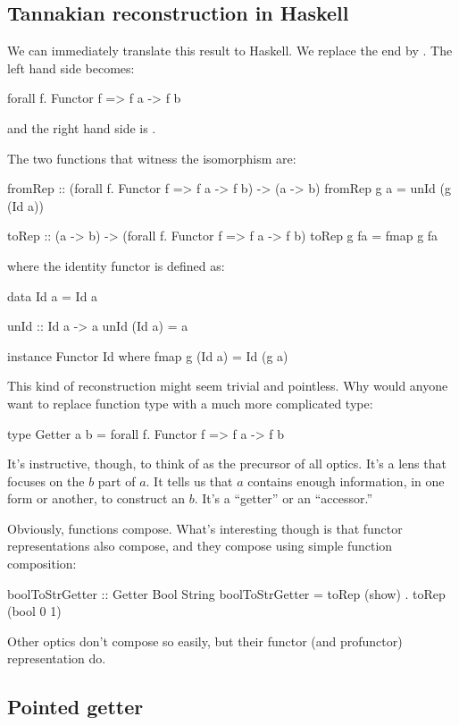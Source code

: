 \documentclass[DaoFP]{subfiles}
\begin{document}
\subsection{Tannakian reconstruction in Haskell}

We can immediately translate this result to Haskell. We replace the end by . The left hand side becomes:
\begin{haskell}
forall f. Functor f => f a -> f b
\end{haskell}
and the right hand side is .

The two functions that witness the isomorphism are:
\begin{haskell}
fromRep :: (forall f. Functor f => f a -> f b) -> (a -> b)
fromRep g a = unId (g (Id a))

toRep :: (a -> b) -> (forall f. Functor f => f a -> f b)
toRep g fa = fmap g fa
\end{haskell}
where the identity functor is defined as:
\begin{haskell}
data Id a = Id a 
  
unId :: Id a -> a
unId (Id a) = a

instance Functor Id where
  fmap g (Id a) = Id (g a)
\end{haskell}

This kind of reconstruction might seem trivial and pointless. Why would anyone want to replace function type  with a much more complicated type:
\begin{haskell}
type Getter a b = forall f. Functor f => f a -> f b
\end{haskell}
It's instructive, though, to think of  as the precursor of all optics. It's a lens that focuses on the $b$ part of $a$. It tells us that $a$ contains enough information, in one form or another, to construct an $b$. It's a ``getter'' or an ``accessor.'' 

Obviously, functions compose. What's interesting though is that functor representations also compose, and they compose using simple function composition:
\begin{haskell}
boolToStrGetter :: Getter Bool String
boolToStrGetter = toRep (show) . toRep (bool 0 1)
\end{haskell}
Other optics don't compose so easily, but their functor (and profunctor) representation do. 
\subsection{Pointed getter}
\end{document}
